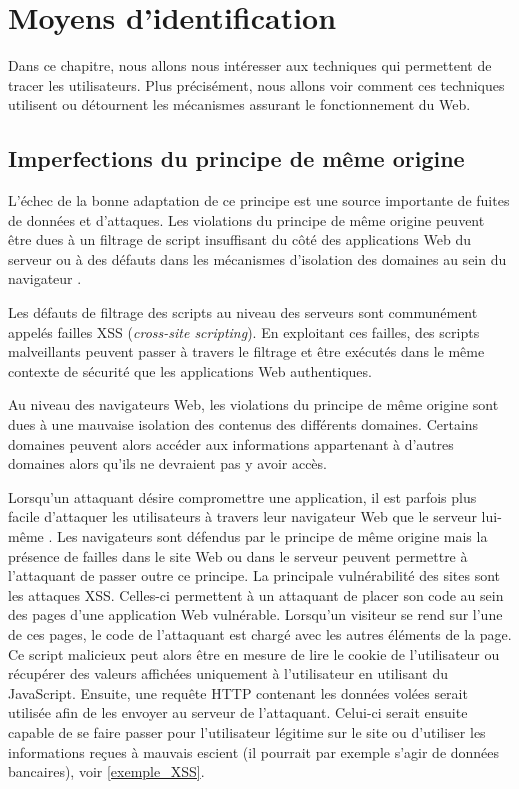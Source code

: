 \chapter{Moyens d'identification}
Dans ce chapitre, nous allons nous intéresser aux techniques qui permettent de tracer les utilisateurs. Plus précisément, nous allons voir comment ces techniques utilisent ou détournent les mécanismes assurant le fonctionnement du Web.

\section{Imperfections du principe de même origine}
\label{imperfections_sop}
L'échec de la bonne adaptation de ce principe est une source importante de fuites de données et d'attaques. Les violations du principe de même origine peuvent être dues à un filtrage de script insuffisant du côté des applications Web du serveur ou à des défauts dans les mécanismes d'isolation des domaines au sein du navigateur \cite{Chen:2007:ABD:1315245.1315248}.

Les défauts de filtrage des scripts au niveau des serveurs sont communément appelés failles XSS (\textit{cross-site scripting}). En exploitant ces failles, des scripts malveillants peuvent passer à travers le filtrage et être exécutés dans le même contexte de sécurité que les applications Web authentiques.

Au niveau des navigateurs Web, les violations du principe de même origine sont dues à une mauvaise isolation des contenus des différents domaines. Certains domaines peuvent alors accéder aux informations appartenant à d'autres domaines alors qu'ils ne devraient pas y avoir accès.
\newline

Lorsqu'un attaquant désire compromettre une application, il est parfois plus facile d'attaquer les utilisateurs à travers leur navigateur Web que le serveur lui-même \cite{sullivan2011web}. Les navigateurs sont défendus par le principe de même origine mais la présence de failles dans le site Web ou dans le serveur peuvent permettre à l'attaquant de passer outre ce principe. La principale vulnérabilité des sites sont les attaques XSS. Celles-ci permettent à un attaquant de placer son code au sein des pages d'une application Web vulnérable. Lorsqu'un visiteur se rend sur l'une de ces pages, le code de l'attaquant est chargé avec les autres éléments de la page. Ce script malicieux peut alors être en mesure de lire le cookie de l'utilisateur ou récupérer des valeurs affichées uniquement à l'utilisateur en utilisant du JavaScript. Ensuite, une requête HTTP contenant les données volées serait utilisée afin de les envoyer au serveur de l'attaquant. Celui-ci serait ensuite capable de se faire passer pour l'utilisateur légitime sur le site ou d'utiliser les informations reçues à mauvais escient (il pourrait par exemple s'agir de données bancaires), voir \autoref{exemple_XSS}.
\newline

